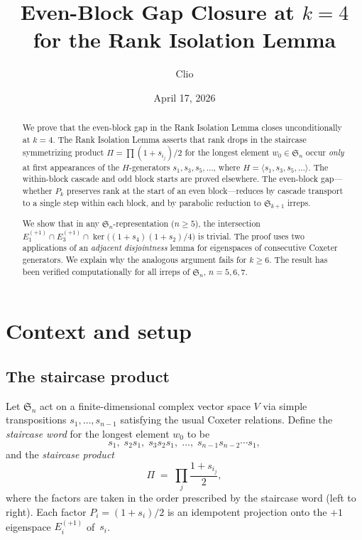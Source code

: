 \documentclass[11pt]{article}
\title{Even-Block Gap Closure at $k = 4$\\for the Rank Isolation Lemma}
\author{Clio}
\date{April 17, 2026}
\theoremstyle{definition}
\theoremstyle{remark}
\newcommand{\Sym}{\mathfrak{S}}
\begin{document}
\maketitle

\begin{abstract}
We prove that the even-block gap in the Rank Isolation Lemma closes
unconditionally at $k = 4$.  The Rank Isolation Lemma asserts that rank
drops in the staircase symmetrizing product
$\Pi = \prod (1 + s_{i_j})/2$ for the longest element $w_0 \in \Sym_n$
occur \emph{only} at first appearances of the $H$-generators
$s_1, s_3, s_5, \ldots$, where $H = \langle s_1, s_3, s_5, \ldots \rangle$.
The within-block cascade and odd block starts are proved elsewhere.
The even-block gap---whether $P_k$ preserves rank at the start of an
even block---reduces by cascade transport to a single step within each
block, and by parabolic reduction to $\Sym_{k+1}$ irreps.

We show that in any $\Sym_n$-representation ($n \ge 5$), the
intersection $E_1^{(+1)} \cap E_3^{(+1)} \cap
\ker\bigl((1{+}s_4)(1{+}s_2)/4\bigr)$ is trivial.  The proof uses two
applications of an \emph{adjacent disjointness} lemma for eigenspaces
of consecutive Coxeter generators.  We explain why the analogous argument
fails for $k \ge 6$.  The result has been verified computationally for
all irreps of $\Sym_n$, $n = 5, 6, 7$.
\end{abstract}


\section{Context and setup}

\subsection{The staircase product}

Let $\Sym_n$ act on a finite-dimensional complex vector space $V$
via simple transpositions $s_1, \ldots, s_{n-1}$ satisfying the usual
Coxeter relations.  Define the \emph{staircase word} for the longest
element $w_0$ to be
\[
  s_1,\; s_2 s_1,\; s_3 s_2 s_1,\; \ldots,\; s_{n-1} s_{n-2} \cdots s_1,
\]
and the \emph{staircase product}
\[
  \Pi \;=\; \prod_{j} \frac{1 + s_{i_j}}{2},
\]
where the factors are taken in the order prescribed by the staircase
word (left to right).  Each factor $P_i = (1 + s_i)/2$ is an
idempotent projection onto the $+1$ eigenspace $E_i^{(+1)}$ of~$s_i$.
\end{document}
